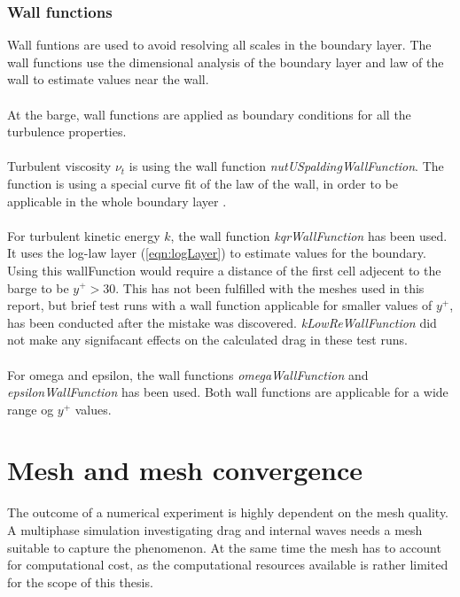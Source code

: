 \documentclass[a4paper, 12pt]{report}
\begin{document}
\subsubsection{Wall functions}
Wall funtions are used to avoid resolving all scales in the boundary layer. The wall functions use the dimensional analysis of the boundary layer and law of the wall to estimate values near the wall.\\
\\
At the barge, wall functions are applied as boundary conditions for all the turbulence properties.\\
\\
Turbulent viscosity $\nu_t$ is using the wall function \textit{nutUSpaldingWallFunction}. The function is using a special curve fit of the law of the wall, in order to be applicable in the whole boundary layer \cite{Spalding}.\\
\\
For turbulent kinetic energy $k$, the wall function \textit{kqrWallFunction} has been used. It uses the log-law layer (\ref{eqn:logLayer}) to estimate values for the boundary. Using this wallFunction would require a distance of the first cell adjecent to the barge to be $y^+ > 30$. This has not been fulfilled with the meshes used in this report, but brief test runs with a wall function applicable for smaller values of $y^+$, has been conducted after the mistake was discovered. \textit{kLowReWallFunction} did not make any signifacant effects on the calculated drag in these test runs.\\
\\
For omega and epsilon, the wall functions \textit{omegaWallFunction} and \textit{epsilonWallFunction} has been used. Both wall functions are applicable for a wide range og $y^+$ values.
\section{Mesh and mesh convergence}
The outcome of a numerical experiment is highly dependent on the mesh quality. A multiphase simulation investigating drag and internal waves needs a mesh suitable to capture the phenomenon. At the same time the mesh has to account for computational cost, as the computational resources available is rather limited for the scope of this thesis.
\end{document}
